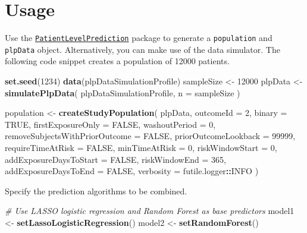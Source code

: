 \documentclass[]{article}
\newenvironment{Shaded}{\begin{snugshade}}{\end{snugshade}}
\newcommand{\KeywordTok}[1]{\textcolor[rgb]{0.13,0.29,0.53}{\textbf{#1}}}
\newcommand{\DataTypeTok}[1]{\textcolor[rgb]{0.13,0.29,0.53}{#1}}
\newcommand{\DecValTok}[1]{\textcolor[rgb]{0.00,0.00,0.81}{#1}}
\newcommand{\StringTok}[1]{\textcolor[rgb]{0.31,0.60,0.02}{#1}}
\newcommand{\CommentTok}[1]{\textcolor[rgb]{0.56,0.35,0.01}{\textit{#1}}}
\newcommand{\OtherTok}[1]{\textcolor[rgb]{0.56,0.35,0.01}{#1}}
\newcommand{\OperatorTok}[1]{\textcolor[rgb]{0.81,0.36,0.00}{\textbf{#1}}}
\newcommand{\NormalTok}[1]{#1}
\begin{document}
\section{Usage}\label{usage}

Use the
\href{http://github.com/OHDSI/PatientLevelPrediction}{\texttt{PatientLevelPrediction}}
package to generate a \texttt{population} and \texttt{plpData} object.
Alternatively, you can make use of the data simulator. The following
code snippet creates a population of 12000 patients.

\begin{Shaded}
\begin{Highlighting}[]
\KeywordTok{set.seed}\NormalTok{(}\DecValTok{1234}\NormalTok{)}
\KeywordTok{data}\NormalTok{(plpDataSimulationProfile)}
\NormalTok{sampleSize <-}\StringTok{ }\DecValTok{12000}
\NormalTok{plpData <-}\StringTok{ }\KeywordTok{simulatePlpData}\NormalTok{(}
\NormalTok{  plpDataSimulationProfile,}
  \DataTypeTok{n =}\NormalTok{ sampleSize}
\NormalTok{)}

\NormalTok{population <-}\StringTok{ }\KeywordTok{createStudyPopulation}\NormalTok{(}
\NormalTok{  plpData,}
  \DataTypeTok{outcomeId =} \DecValTok{2}\NormalTok{,}
  \DataTypeTok{binary =} \OtherTok{TRUE}\NormalTok{,}
  \DataTypeTok{firstExposureOnly =} \OtherTok{FALSE}\NormalTok{,}
  \DataTypeTok{washoutPeriod =} \DecValTok{0}\NormalTok{,}
  \DataTypeTok{removeSubjectsWithPriorOutcome =} \OtherTok{FALSE}\NormalTok{,}
  \DataTypeTok{priorOutcomeLookback =} \DecValTok{99999}\NormalTok{,}
  \DataTypeTok{requireTimeAtRisk =} \OtherTok{FALSE}\NormalTok{,}
  \DataTypeTok{minTimeAtRisk =} \DecValTok{0}\NormalTok{,}
  \DataTypeTok{riskWindowStart =} \DecValTok{0}\NormalTok{,}
  \DataTypeTok{addExposureDaysToStart =} \OtherTok{FALSE}\NormalTok{,}
  \DataTypeTok{riskWindowEnd =} \DecValTok{365}\NormalTok{,}
  \DataTypeTok{addExposureDaysToEnd =} \OtherTok{FALSE}\NormalTok{,}
  \DataTypeTok{verbosity =}\NormalTok{ futile.logger}\OperatorTok{::}\NormalTok{INFO}
\NormalTok{)}
\end{Highlighting}
\end{Shaded}

Specify the prediction algorithms to be combined.

\begin{Shaded}
\begin{Highlighting}[]
\CommentTok{# Use LASSO logistic regression and Random Forest as base predictors}
\NormalTok{model1 <-}\StringTok{ }\KeywordTok{setLassoLogisticRegression}\NormalTok{()}
\NormalTok{model2 <-}\StringTok{ }\KeywordTok{setRandomForest}\NormalTok{()}
\end{Highlighting}
\end{Shaded}
\end{document}
